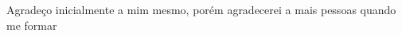 \begin{agradecimentos}

Agradeço inicialmente a mim mesmo, porém agradecerei a mais pessoas quando me formar

\end{agradecimentos}
